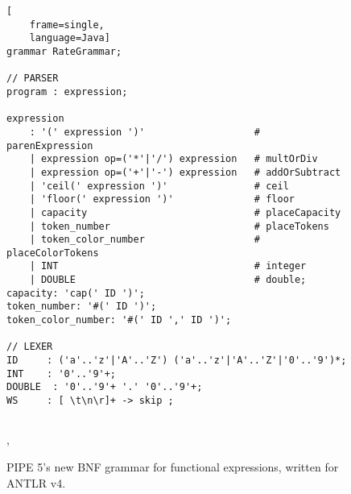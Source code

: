 \mediumlinespacing
\begin{figure}
\begin{lstlisting}[
    frame=single,
    language=Java]
grammar RateGrammar;

// PARSER
program : expression;

expression
    : '(' expression ')'                   # parenExpression
    | expression op=('*'|'/') expression   # multOrDiv
    | expression op=('+'|'-') expression   # addOrSubtract
    | 'ceil(' expression ')'               # ceil
    | 'floor(' expression ')'              # floor
    | capacity                             # placeCapacity
    | token_number                         # placeTokens
    | token_color_number                   # placeColorTokens
    | INT                                  # integer
    | DOUBLE                               # double;
capacity: 'cap(' ID ')';
token_number: '#(' ID ')';
token_color_number: '#(' ID ',' ID ')';

// LEXER
ID     : ('a'..'z'|'A'..'Z') ('a'..'z'|'A'..'Z'|'0'..'9')*;
INT    : '0'..'9'+;
DOUBLE  : '0'..'9'+ '.' '0'..'9'+;
WS     : [ \t\n\r]+ -> skip ;
    
\end{lstlisting}
\caption{PIPE 5's new BNF grammar for functional expressions, written for ANTLR v4.}

\label{lst:bnf},
\end{figure}
\normallinespacing